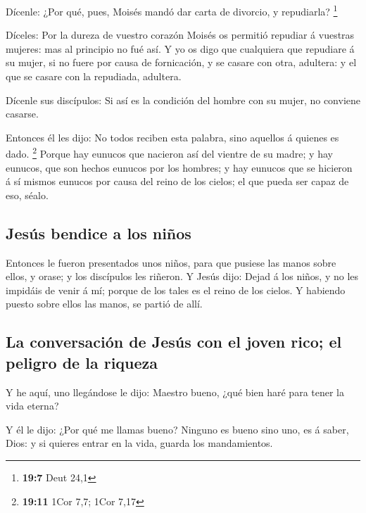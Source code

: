  Dícenle: ¿Por qué, pues, Moisés mandó dar carta de
divorcio, y repudiarla? \footnote{\textbf{19:7} Deut 24,1}

 Díceles: Por la dureza de vuestro corazón Moisés os
permitió repudiar á vuestras mujeres: mas al principio no fué así.
 Y yo os digo que cualquiera que repudiare á su mujer, si
no fuere por causa de fornicación, y se casare con otra, adultera: y el
que se casare con la repudiada, adultera.

 Dícenle sus discípulos: Si así es la condición del
hombre con su mujer, no conviene casarse.

 Entonces él les dijo: No todos reciben esta palabra,
sino aquellos á quienes es dado. \footnote{\textbf{19:11} 1Cor 7,7; 1Cor
  7,17}  Porque hay eunucos que nacieron así del vientre
de su madre; y hay eunucos, que son hechos eunucos por los hombres; y
hay eunucos que se hicieron á sí mismos eunucos por causa del reino de
los cielos; el que pueda ser capaz de eso, séalo.

\hypertarget{jesuxfas-bendice-a-los-niuxf1os}{%
\subsection{Jesús bendice a los
niños}\label{jesuxfas-bendice-a-los-niuxf1os}}

 Entonces le fueron presentados unos niños, para que
pusiese las manos sobre ellos, y orase; y los discípulos les riñeron.
 Y Jesús dijo: Dejad á los niños, y no les impidáis de
venir á mí; porque de los tales es el reino de los cielos.
 Y habiendo puesto sobre ellos las manos, se partió de
allí.

\hypertarget{la-conversaciuxf3n-de-jesuxfas-con-el-joven-rico-el-peligro-de-la-riqueza}{%
\subsection{La conversación de Jesús con el joven rico; el peligro de la
riqueza}\label{la-conversaciuxf3n-de-jesuxfas-con-el-joven-rico-el-peligro-de-la-riqueza}}

 Y he aquí, uno llegándose le dijo: Maestro bueno, ¿qué
bien haré para tener la vida eterna?

 Y él le dijo: ¿Por qué me llamas bueno? Ninguno es bueno
sino uno, es á saber, Dios: y si quieres entrar en la vida, guarda los
mandamientos.

